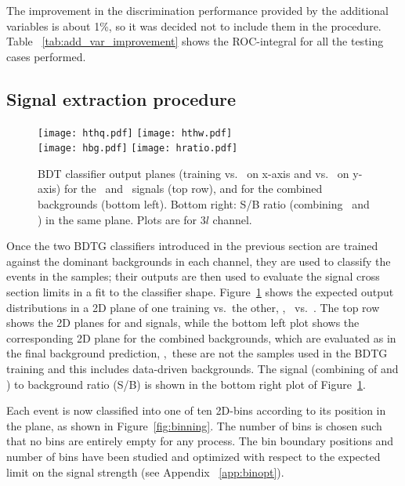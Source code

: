 The improvement in the discrimination performance provided by the additional variables is about 1\%, so it was decided not to include them in the procedure. Table ~\ref{tab:add_var_improvement} shows the ROC-integral for all the testing cases performed.

\subsection{Signal extraction procedure}

\begin{figure} [!h]
 \centering
 \texttt{[image: hthq.pdf]}
 \texttt{[image: hthw.pdf]}\\
 \texttt{[image: hbg.pdf]}
 \texttt{[image: hratio.pdf]}
\caption[2D BDT classifier output planes]{BDT classifier output planes (training vs. \ttbar\ on x-axis and vs. \ttV\ on y-axis) for the \tHq\ and \tHW\ signals (top row), and for the combined backgrounds (bottom left). Bottom right: S/B ratio (combining \tHq\ and \tHW) in the same plane. Plots are for $3l$ channel.}
\label{fig:mva12}
\end{figure}

Once the two BDTG classifiers introduced in the previous section are trained against the dominant backgrounds in each channel, they are used to classify the events in the samples; their outputs are then used to evaluate the signal cross section limits in a fit to the classifier shape. Figure~\ref{fig:mva12} shows the expected output distributions in a 2D plane of one training vs.\ the other, \ie, \ttV\ vs.\ \ttbar. The top row shows the 2D planes for \tHq and \tHW signals, while the bottom left plot shows the corresponding 2D plane for the combined backgrounds, which are evaluated as in the final background prediction, \ie,\ these are not the samples used in the BDTG training and this includes data-driven backgrounds. The signal (combining of \tHq and \tHW) to background ratio (S/B) is shown in the bottom right plot of Figure~\ref{fig:mva12}.      

Each event is now classified into one of ten 2D-bins according to its position in the plane, as shown in Figure~\ref{fig:binning}. The number of bins is chosen such that no bins are entirely empty for any process. The bin boundary positions and number of bins have been studied and optimized with respect to the expected limit on the signal strength (see Appendix ~\ref{app:binopt}).

